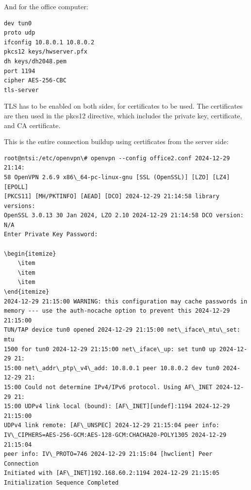 And for the office computer:

\begin{verbatim}
dev tun0
proto udp
ifconfig 10.8.0.1 10.8.0.2
pkcs12 keys/hwserver.pfx
dh keys/dh2048.pem
port 1194
cipher AES-256-CBC
tls-server
\end{verbatim}

TLS has to be enabled on both sides, for certificates to be used. The certificates are then used in the pkcs12 directive, which includes the private key, certificate, and CA certificate.

This is the entire connection buildup using certificates from the server side:

\begin{verbatim}
root@ntsi:/etc/openvpn\# openvpn --config office2.conf 2024-12-29 21:14:
58 OpenVPN 2.6.9 x86\_64-pc-linux-gnu [SSL (OpenSSL)] [LZO] [LZ4] [EPOLL]
[PKCS11] [MH/PKTINFO] [AEAD] [DCO] 2024-12-29 21:14:58 library versions:
OpenSSL 3.0.13 30 Jan 2024, LZO 2.10 2024-12-29 21:14:58 DCO version: N/A
Enter Private Key Password:

\begin{itemize}
    \item
    \item
    \item
\end{itemize}
2024-12-29 21:15:00 WARNING: this configuration may cache passwords in
memory --- use the auth-nocache option to prevent this 2024-12-29 21:15:00
TUN/TAP device tun0 opened 2024-12-29 21:15:00 net\_iface\_mtu\_set: mtu
1500 for tun0 2024-12-29 21:15:00 net\_iface\_up: set tun0 up 2024-12-29 21:
15:00 net\_addr\_ptp\_v4\_add: 10.8.0.1 peer 10.8.0.2 dev tun0 2024-12-29 21:
15:00 Could not determine IPv4/IPv6 protocol. Using AF\_INET 2024-12-29 21:
15:00 UDPv4 link local (bound): [AF\_INET][undef]:1194 2024-12-29 21:15:00
UDPv4 link remote: [AF\_UNSPEC] 2024-12-29 21:15:04 peer info:
IV\_CIPHERS=AES-256-GCM:AES-128-GCM:CHACHA20-POLY1305 2024-12-29 21:15:04
peer info: IV\_PROTO=746 2024-12-29 21:15:04 [hwclient] Peer Connection
Initiated with [AF\_INET]192.168.60.2:1194 2024-12-29 21:15:05
Initialization Sequence Completed
\end{verbatim}